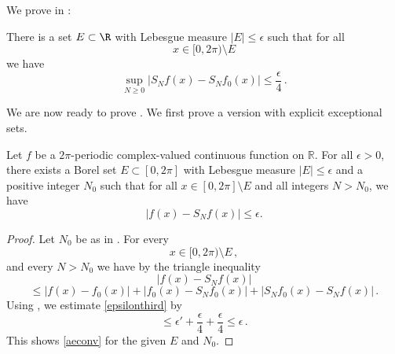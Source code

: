 We prove in :
\begin{lemma}
\label{control-approximation-effect}
\leanok
{}
    There is a set $E \subset \R$ with Lebesgue measure
    $|E|\le \epsilon$ such that for all
    \begin{equation}
        x\in [0,2\pi)\setminus E
    \end{equation}
   we have
   \begin{equation}
    \label{eq-max-partial-sum-diff}
    \sup_{N\ge 0} |S_Nf(x)-S_Nf_0(x)| \le \frac \epsilon 4\,.
    \end{equation}
\end{lemma}

We are now ready to prove . We first prove a version with explicit exceptional sets.

\begin{theorem}
    \label{exceptional-set-carleson}
    \leanok
    Let $f$ be a $2\pi$-periodic complex-valued continuous function on $\mathbb{R}$. For all $\epsilon>0$, there exists a Borel set $E\subset [0,2\pi]$ with Lebesgue measure $|E|\le \epsilon$ and a positive integer $N_0$ such that for all $x\in [0,2\pi]\setminus E$ and all integers $N>N_0$, we have
    \begin{equation}\label{aeconv}
    |f(x)-S_N f(x)|\le \epsilon.
    \end{equation}
\end{theorem}
\begin{proof}
\leanok
Let $N_0$ be as in .
For every
\begin{equation}
x\in [0, 2\pi) \setminus E\, ,
\end{equation}
and every $N>N_0$ we have by the triangle inequality
\begin{equation*}
    |f(x)-S_Nf(x)|
    \end{equation*}
    \begin{equation}\label{epsilonthird}
    \le |f(x)-f_0(x)|+ |f_0(x)-S_Nf_0(x)|+|S_Nf_0(x)-S_N f(x)|\, .
\end{equation}
Using , we estimate \eqref{epsilonthird} by
\begin{equation}
    \le \epsilon' +\frac \epsilon 4 +\frac \epsilon 4\le \epsilon\, .
\end{equation}
This shows \eqref{aeconv} for the given $E$ and $N_0$.
\end{proof}

